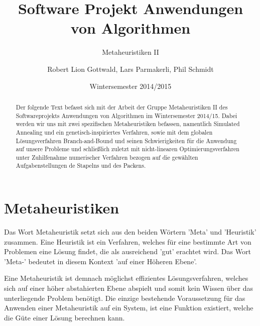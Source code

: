 \documentclass[runningheads,a4paper]{llncs}
\begin{document}
\mainmatter

\title{Software Projekt Anwendungen von Algorithmen}
\subtitle{Metaheuristiken II}
\date{Wintersemester 2014/2015}

\author{Robert Lion Gottwald, Lars Parmakerli, Phil Schmidt}

\maketitle
\begin{abstract}
Der folgende Text befasst sich mit der Arbeit der Gruppe Metaheuristiken II des Softwareprojekts Anwendungen von Algorithmen im Wintersemester 2014/15. Dabei werden wir uns mit zwei  spezifischen Metaheuristiken befassen, namentlich Simulated Annealing und ein genetisch-inspiriertes Verfahren, sowie mit dem globalen Lösungsverfahren Branch-and-Bound und seinen Schwierigkeiten für die Anwendung auf unsere Probleme und schließlich zuletzt mit nicht-linearen Optimierungsverfahren unter Zuhilfenahme numerischer Verfahren bezogen auf die gewählten Aufgabenstellungen de Stapelns und des Packens.

\end{abstract}

\section{Metaheuristiken}

Das Wort Metaheuristik setzt sich aus den beiden Wörtern 'Meta' und 'Heuristik'  zusammen.
Eine Heuristik ist ein Verfahren, welches für eine bestimmte Art von Problemen eine Lösung findet, die als ausreichend 'gut' erachtet wird. 
Das Wort 'Meta-' bedeutet in diesem Kontext 'auf einer Höheren Ebene'.

Eine Metaheuristik ist demnach möglichst effizientes Lösungsverfahren, welches sich auf einer höher abstahierten Ebene abspielt und somit kein Wissen über das unterliegende Problem benötigt. Die einzige bestehende Voraussetzung für das Anwenden einer Metaheuristik auf ein System, ist eine Funktion existiert, welche die Güte einer Lösung berechnen kann.
\end{document}
